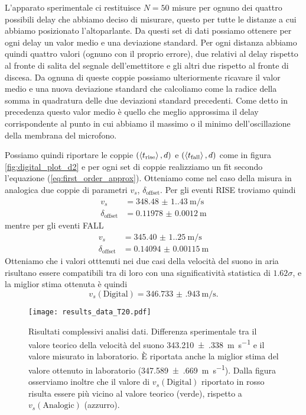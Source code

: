 \documentclass[
    prl,
    reprint, 
    superscriptaddress, 
    altaffilletter, 
    amsmath, 
    amssymb, 
    a4paper,
    varvw]{revtex4-2}
\begin{document}
L'apparato sperimentale ci restituisce $N=50$ misure per ognuno dei quattro possibili delay che abbiamo deciso di misurare, questo per tutte le distanze a cui abbiamo posizionato l'altoparlante. Da questi set di dati possiamo ottenere per ogni delay un valor medio e una deviazione standard. Per ogni distanza abbiamo quindi quattro valori (ognuno con il proprio errore), due relativi al delay rispetto al fronte di salita del segnale dell'emettitore e gli altri due rispetto al fronte di discesa. Da ognuna di queste coppie possiamo ulteriormente ricavare il valor medio e una nuova deviazione standard che calcoliamo come la radice della somma in quadratura delle due deviazioni standard precedenti. Come detto in precedenza questo valor medio è quello che meglio approssima il delay corrispondente al punto in cui abbiamo il massimo o il minimo dell'oscillazione della membrana del microfono. 

Possiamo quindi riportare le coppie $(\expval{t_\text{rise}}, d)$ e $(\expval{t_\text{fall}}, d)$ come in figura \ref{fig:digital_plot_d2} e per ogni set di coppie realizziamo un fit secondo l'equazione (\ref{eq:first_order_approx}). Otteniamo come nel caso della misura in analogica due coppie di parametri $v_s$, $\delta_\text{offset}$.
Per gli eventi RISE troviamo quindi
\begin{align*}
    v_s &= \SI{348.48(1.43)}{\metre\per\second} \\
    \delta_\text{offset} &= \SI{0.11978(120)}{\metre}
\end{align*}
mentre per gli eventi FALL
\begin{align*}
    v_s &= \SI{345.40(1.25)}{\metre\per\second} \\
    \delta_\text{offset} &= \SI{0.14094(115)}{\metre}
\end{align*}
Otteniamo che i valori otttenuti nei due casi della velocità del suono in aria risultano essere compatibili tra di loro con una significatività statistica di $1.62\sigma$, e la miglior stima ottenuta è quindi \[v_s(\text{Digital}) = \SI{346.733(943)}{\metre\per\second}.\]


\begin{figure}
    \centering
    \texttt{[image: results\_data\_T20.pdf]}
    \caption{Risultati complessivi analisi dati. Differenza sperimentale tra il valore teorico della velocità del suono \SI{343.210(338)}{\metre\per\second} e il valore misurato in laboratorio. \`E riportata anche la miglior stima del valore ottenuto in laboratorio (\SI{347.589(669)}{\metre\per\second}). Dalla figura osserviamo inoltre che il valore di $v_s(\text{Digital})$ riportato in rosso risulta essere più vicino al valore teorico (verde), rispetto a $v_s(\text{Analogic})$ (azzurro).}\label{fig:results}
\end{figure}
\end{document}
